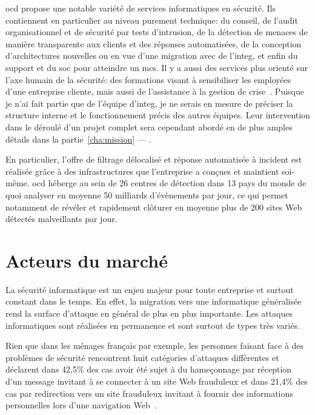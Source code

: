 \documentclass[12pt, oneside, a4paper, titlepage]{report}
\begin{document}
\acrlong{ocd} propose une notable variété de services informatiques en sécurité.
Ils contiennent en particulier au niveau purement technique: du conseil, de
l'audit organisationnel et de sécurité par tests d'intrusion, de la détection de
menaces de manière transparente aux clients et des réponses automatisées, de la
conception d'architectures nouvelles ou en vue d'une migration avec de
l'\gls{integ}, et enfin du support et du \gls{soc} pour atteindre un \gls{mcs}.
Il y a aussi des services plus orienté sur l'axe humain de la sécurité: des
formations visant à sensibiliser les employées d'une entreprise cliente, mais
aussi de l'assistance à la gestion de crise~\cite{ocd}.  Puisque je n'ai fait
partie que de l'équipe d'\gls{integ}, je ne serais en mesure de préciser la
structure interne et le fonctionnement précis des autres équipes. Leur
intervention dans le déroulé d'un projet complet sera cependant abordé en de
plus amples détails dans la partie~\ref{cha:mission} --- .

En particulier, l'offre de filtrage délocalisé et réponse automatisée à incident
est réalisée grâce à des infrastructures que l'entreprise a conçues et maintient
soi-même. \acrlong{ocd} héberge au sein de 26 centres de détection dans 13 pays
du monde de quoi analyser en moyenne 50 milliards d'évènements par jour, ce qui
permet notamment de révéler et rapidement clôturer en moyenne plus de 200 sites
Web détectés malveillants par jour.


\section{Acteurs du marché}%
\label{sec:intro::acteurs}

La sécurité informatique est un enjeu majeur pour toute entreprise et surtout
constant dans le temps. En effet, la migration vers une informatique généralisée
rend la surface d'attaque en général de plus en plus importante. Les attaques
informatiques sont réalisées en permanence et sont surtout de types très variés.

Rien que dans les ménages français par exemple, les personnes faisant face à des
problèmes de sécurité rencontrent huit catégories d'attaques différentes et
déclarent dans 42,5\% des cas avoir été sujet à du hameçonnage par réception
d'un message invitant à se connecter à un site Web frauduleux et dans 21,4\% des
cas par redirection vers un site frauduleux invitant à fournir des informations
personnelles lors d'une navigation Web~\cite{attack-types}.
\end{document}
